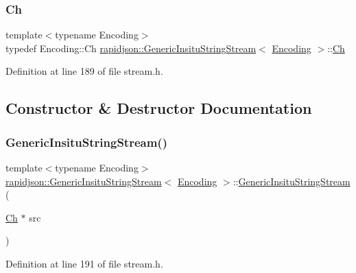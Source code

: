 \subsubsection{\texorpdfstring{Ch}{Ch}}
{\footnotesize\ttfamily template$<$typename Encoding$>$ \\
typedef Encoding\+::\+Ch \mbox{\hyperlink{structrapidjson_1_1_generic_insitu_string_stream}{rapidjson\+::\+Generic\+Insitu\+String\+Stream}}$<$ \mbox{\hyperlink{classrapidjson_1_1_encoding}{Encoding}} $>$\+::\mbox{\hyperlink{structrapidjson_1_1_generic_insitu_string_stream_a3a7ed47ee193d1e5f850aa841b743631}{Ch}}}



Definition at line 189 of file stream.\+h.



\subsection{Constructor \& Destructor Documentation}
\mbox{\label{structrapidjson_1_1_generic_insitu_string_stream_a5a17e183fec782bf9bc11d247ffbee73}} 
\subsubsection{\texorpdfstring{GenericInsituStringStream()}{GenericInsituStringStream()}}
{\footnotesize\ttfamily template$<$typename Encoding$>$ \\
\mbox{\hyperlink{structrapidjson_1_1_generic_insitu_string_stream}{rapidjson\+::\+Generic\+Insitu\+String\+Stream}}$<$ \mbox{\hyperlink{classrapidjson_1_1_encoding}{Encoding}} $>$\+::\mbox{\hyperlink{structrapidjson_1_1_generic_insitu_string_stream}{Generic\+Insitu\+String\+Stream}} (\begin{DoxyParamCaption}\item[{\mbox{\hyperlink{structrapidjson_1_1_generic_insitu_string_stream_a3a7ed47ee193d1e5f850aa841b743631}{Ch}} $\ast$}]{src }\end{DoxyParamCaption})}



Definition at line 191 of file stream.\+h.


